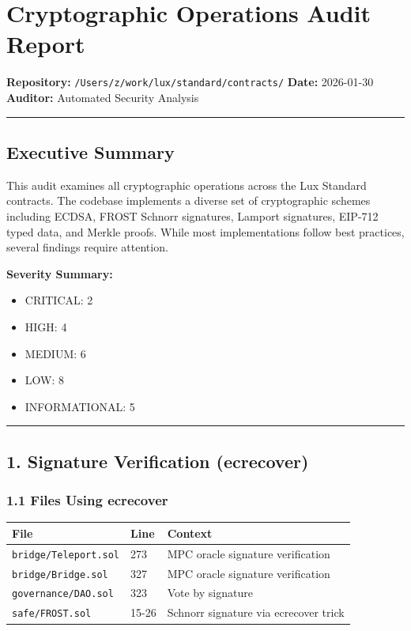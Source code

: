 \documentclass[
]{article}
\author{}
\date{}
\newcounter{none} %
\providecommand{\tightlist}{%
  \setlength{\itemsep}{0pt}\setlength{\parskip}{0pt}}
\begin{document}
\section{Cryptographic Operations Audit
Report}\label{cryptographic-operations-audit-report}

\textbf{Repository:} \texttt{/Users/z/work/lux/standard/contracts/}
\textbf{Date:} 2026-01-30 \textbf{Auditor:} Automated Security Analysis

\begin{center}\rule{0.5\linewidth}{0.5pt}\end{center}

\subsection{Executive Summary}\label{executive-summary}

This audit examines all cryptographic operations across the Lux Standard
contracts. The codebase implements a diverse set of cryptographic
schemes including ECDSA, FROST Schnorr signatures, Lamport signatures,
EIP-712 typed data, and Merkle proofs. While most implementations follow
best practices, several findings require attention.

\textbf{Severity Summary:}

\begin{itemize}
\tightlist
\item
  CRITICAL: 2
\item
  HIGH: 4
\item
  MEDIUM: 6
\item
  LOW: 8
\item
  INFORMATIONAL: 5
\end{itemize}

\begin{center}\rule{0.5\linewidth}{0.5pt}\end{center}

\subsection{1. Signature Verification
(ecrecover)}\label{1-signature-verification-ecrecover}

\subsubsection{1.1 Files Using
ecrecover}\label{11-files-using-ecrecover}

{\def\LTcaptype{none} %
\begin{longtable}[]{@{}lll@{}}
\toprule\noalign{}
File & Line & Context \\
\midrule\noalign{}
\endhead
\bottomrule\noalign{}
\endlastfoot
\texttt{bridge/Teleport.sol} & 273 & MPC oracle signature
verification \\
\texttt{bridge/Bridge.sol} & 327 & MPC oracle signature verification \\
\texttt{governance/DAO.sol} & 323 & Vote by signature \\
\texttt{safe/FROST.sol} & 15-26 & Schnorr signature via ecrecover
trick \\
\end{longtable}
}
\end{document}
